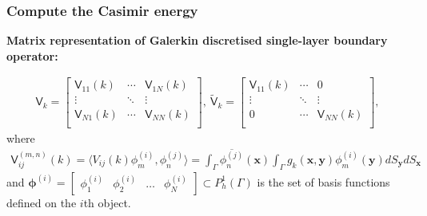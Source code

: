 \documentclass[dvipsnames,10pt]{beamer}
\begin{document}
\begin{frame}
    \frametitle{Compute the Casimir energy}
\vspace{0.3cm}

\textbf{Matrix representation of Galerkin discretised single-layer boundary operator:}

\begin{align*}
    \mathsf{V}_{k} = \begin{bmatrix}
        \mathsf{V}_{11}(k) & \cdots & \mathsf{V}_{1N}(k) \\
        \vdots & \ddots & \vdots \\
        \mathsf{V}_{N1}(k)  & \cdots & \mathsf{V}_{NN}(k) \\
\end{bmatrix}, \ 
\tilde{\mathsf{V}}_{k} =  \begin{bmatrix}
        \mathsf{V}_{11}(k)     & \cdots & 0 \\
    \vdots & \ddots & \vdots \\
    0          & \cdots & \mathsf{V}_{NN}(k) \\
\end{bmatrix},
\end{align*}
where \begin{align*}
    \mathsf{V}_{ij}^{(m,n)} (k) = \langle V_{ij}(k)\phi_{m}^{(i)}, \phi_{n}^{(j)}\rangle = 
    \int_{\Gamma}\overline{\phi_{n}^{(j)}}(\boldsymbol{x})\int_{\Gamma}g_{k}(\boldsymbol{x}, \boldsymbol{y})\phi_{m}^{(i)}(\boldsymbol{y})dS_{\boldsymbol{y}}dS_{\boldsymbol{x}}
\end{align*}   
and $\boldsymbol{\phi}^{(i)} = \begin{bmatrix}
    \phi_{1}^{(i)} & \phi_{2}^{(i)} & \dots & \phi_{N}^{(i)}
\end{bmatrix}\subset P_{h}^{1}(\Gamma)$  is the set of basis functions defined on the $i$th object.
\end{frame}
\end{document}
